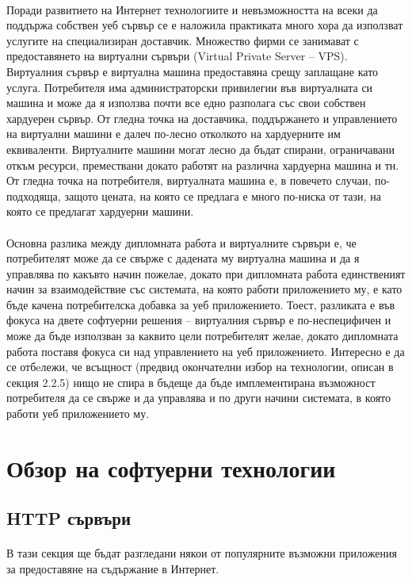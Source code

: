 \documentclass[pdftex,14pt,a4paper]{extreport}
\begin{document}
\paragraph {}
Поради развитието на Интернет технологиите и невъзможността на всеки да поддържа собствен уеб сървър се е наложила практиката много хора да използват услугите на специализиран доставчик. Множество фирми се занимават с предоставянето на виртуални сървъри (Virtual Private Server – VPS). Виртуалния сървър е виртуална машина предоставяна срещу заплащане като услуга. Потребителя има администраторски привилегии във виртуалната си машина и може да я използва почти все едно разполага със свои собствен хардуерен сървър. От гледна точка на доставчика, поддържането и управлението на виртуални машини е далеч по-лесно отколкото на хардуерните им еквиваленти. Виртуалните машини могат лесно да бъдат спирани, ограничавани откъм ресурси, премествани докато работят на различна хардуерна машина и тн. От гледна точка на потребителя, виртуалната машина е, в повечето случаи, по-подходяща, защото цената, на която се предлага е много по-ниска от тази, на която се предлагат хардуерни машини.
\paragraph {}
Основна разлика между дипломната работа и виртуалните сървъри е, че потребителят може да се свърже с дадената му виртуална машина и да я управлява по какъвто начин пожелае, докато при дипломната работа единственият начин за взаимодействие със системата, на която работи приложението му, е като бъде качена потребителска добавка за уеб приложението. Тоест, разликата е във фокуса на двете софтуерни решения – виртуалния сървър е по-неспецифичен и може да бъде използван за каквито цели потребителят желае, докато дипломната работа поставя фокуса си над управлението на уеб приложението. Интересно е да се отбeлежи, че всъщност (предвид окончателни избор на технологии, описан в секция 2.2.5) нищо не спира в бъдеще да бъде имплементирана възможност потребителя да се свърже и да управлява и по други начини системата, в която работи уеб приложението му.
\section {Обзор на софтуерни технологии}
\subsection {HTTP сървъри}
\paragraph {}
В тази секция ще бъдат разгледани някои от популярните възможни приложения за предоставяне на съдържание в Интернет.
\end{document}
